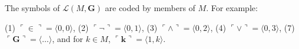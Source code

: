 The symbols of $\mathcal{L}(M, \mathbf{G})$ are coded by members of $M$. For example:

(1) $\ulcorner \in \urcorner = \langle 0, 0 \rangle$,
(2) $\ulcorner \neg \urcorner = \langle 0, 1 \rangle$,
(3) $\ulcorner \wedge \urcorner = \langle 0, 2 \rangle$,
(4) $\ulcorner \vee \urcorner = \langle 0, 3 \rangle$,
(7) $\ulcorner \mathbf{G} \urcorner = \langle \ldots \rangle$, and for $k \in M$, $\ulcorner \mathbf{k} \urcorner = \langle 1, k \rangle$.
